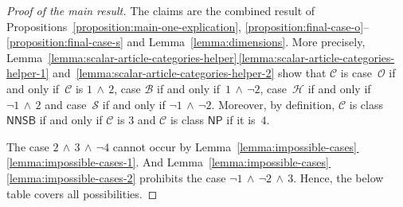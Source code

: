\documentclass[10pt,a4paper]{amsart}
\numberwithin{equation}{section}
\newcommand{\Sand}{\,\wedge\,}
\newcommand{\thecat}{\mathcal{C}}
\newcommand{\onlyneutralnonsingletonblocks}{\mathsf{NNSB}}
\newcommand{\onlyneutralpartitions}{\mathsf{NP}}
\begin{document}
\begin{proof}[Proof of the main result]
  \newcommand{\themat}{v}
  \newcommand{\indi}{i}
  \newcommand{\indj}{j}
  \newcommand{\thecoc}{\eta}
  \newcommand{\thecocx}[1]{\eta(#1)}
  \newcommand{\thebetti}{\beta_1(\widehat{G})}
  \newcommand{\thesum}{\lambda}
  \newcommand{\neutralblocks}{3}
  \newcommand{\neutralpartitions}{4}
  \newcommand{\smallblocks}{1}
  \newcommand{\largeblocks}{2}
  The claims are the combined result of Pro\-po\-si\-tions~\ref{proposition:main-one-explication}, \ref{proposition:final-case-o}--\ref{proposition:final-case-s} and Lem\-ma~\ref{lemma:dimensions}. More precisely, Lem\-ma~\hyperref[lemma:scalar-article-categories-helper-1]{\ref*{lemma:scalar-article-categories-helper}\,\ref*{lemma:scalar-article-categories-helper-1}} and~\hyperref[lemma:scalar-article-categories-helper-2]{\ref*{lemma:scalar-article-categories-helper-2}} show that $\thecat$ is case~$\mathcal{O}$ if and only if~$\thecat$ is $\smallblocks\Sand\largeblocks$, case $\mathcal{B}$ if and only if~$\smallblocks\Sand\neg \largeblocks$, case~$\mathcal{H}$ if and only if $\neg \smallblocks\Sand\largeblocks$ and case~$\mathcal{S}$ if and only if $\neg \smallblocks\Sand\neg\largeblocks$. Moreover, by definition, $\thecat$ is class $\onlyneutralnonsingletonblocks$ if and only if $\thecat$ is $\neutralblocks$  and $\thecat$ is class $\onlyneutralpartitions$ if it is~$\neutralpartitions$.

  The case  $\largeblocks\Sand  \neutralblocks\Sand \neg\neutralpartitions$ cannot occur by Lem\-ma~\hyperref[lemma:impossible-cases-1]{\ref*{lemma:impossible-cases}\,\ref*{lemma:impossible-cases-1}}. And Lem\-ma~\hyperref[lemma:impossible-cases-2]{\ref*{lemma:impossible-cases}\,\ref*{lemma:impossible-cases-2}} prohibits the case  $\neg\smallblocks\Sand \neg\largeblocks\Sand \neutralblocks$. Hence, the below table covers all possibilities.


\end{proof}
\end{document}
